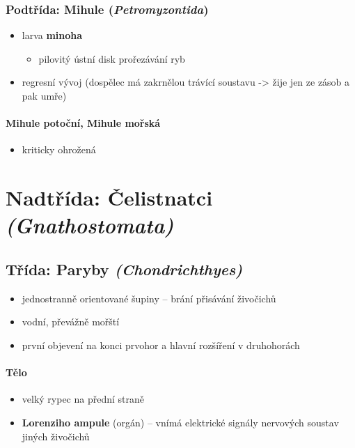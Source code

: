 \subsubsection{Podtřída: Mihule (\textit{Petromyzontida})}
\begin{itemize}
\item larva \textbf{minoha}
	\begin{itemize}
	\item pilovitý ústní disk \ra prořezávání ryb
	\end{itemize}
\item regresní vývoj (dospělec má zakrnělou trávící soustavu -> žije jen ze zásob a pak umře)
\end{itemize}

\paragraph{Mihule potoční, Mihule mořská}
\begin{itemize}
\item kriticky ohrožená
\end{itemize}

\newpage
\section{Nadtřída: Čelistnatci \textit{(Gnathostomata)}}
\subsection{Třída: Paryby \textit{(Chondrichthyes)}}
\begin{itemize}
\item jednostranně orientované šupiny -- brání přisávání živočichů
\item vodní, převážně mořští
\item první objevení na konci prvohor a hlavní rozšíření v druhohorách
\end{itemize}

\paragraph{Tělo}
\begin{itemize}
\item velký rypec na přední straně
\item \textbf{Lorenziho ampule} (orgán) -- vnímá elektrické signály nervových soustav jiných živočichů
\end{itemize}


